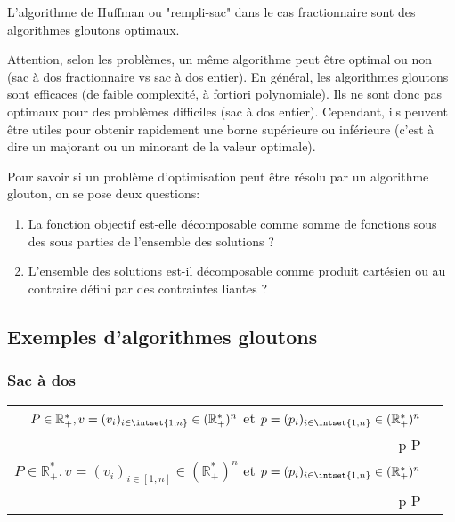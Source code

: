 \documentclass{scrartcl}
\begin{document}
			\exemple L'algorithme de Huffman ou "rempli-sac" dans le cas fractionnaire sont des algorithmes gloutons optimaux.

			\rem Attention, selon les problèmes, un même algorithme peut être optimal ou non (sac à dos fractionnaire vs sac à dos entier). 
			En général, les algorithmes gloutons sont efficaces (de faible complexité, à fortiori polynomiale). 
			Ils ne sont donc pas optimaux pour des problèmes difficiles (sac à dos entier). 
			Cependant, ils peuvent être utiles pour obtenir rapidement une borne supérieure ou inférieure (c'est à dire un majorant ou un minorant de la valeur optimale).

			\rem Pour savoir si un problème d'optimisation peut être résolu par un algorithme glouton, on se pose deux questions:
			\begin{enumerate}
				\item La fonction objectif est-elle décomposable comme somme de fonctions sous des sous parties de l'ensemble des solutions ?
				\item L'ensemble des solutions est-il décomposable comme produit cartésien ou au contraire défini par des contraintes liantes ?
			\end{enumerate}

		\subsection{Exemples d'algorithmes gloutons}
			\subsubsection{Sac à dos}
					\begin{center}\begin{tabular}{r l}
						\pbinlist{Sac à dos}
							{\( P \in \mathbb{R}^*_+, v=(v_i)_{i \in \intset{1,n}} \in (\mathbb{R}^*_+)^n\) et \(p = (p_i)_{i \in \intset{1,n}} \in (\mathbb{R}^*_+)^n\)}
							{\(\max\limits_{\substack{\delta \in \set{0,1}^n \\ \delta\cdot p \leq P}} \underbrace{\delta.v}_{=f(v)}\)} \\[20pt]
						\pbinlist{Sac à dos fractionnaire}
							{\( P \in \mathbb{R}^*_+, v=(v_i)_{i \in [1,n]} \in (\mathbb{R}^*_+)^n\) et \(p = (p_i)_{i \in \intset{1,n}} \in (\mathbb{R}^*_+)^n\)}
							{\(\max\limits_{\substack{\delta \in [0,1]^n \\ \delta\cdot p \leq P}} \underbrace{\delta.v}_{=f(v)}\)}
					\end{tabular}\end{center}	
\end{document}
